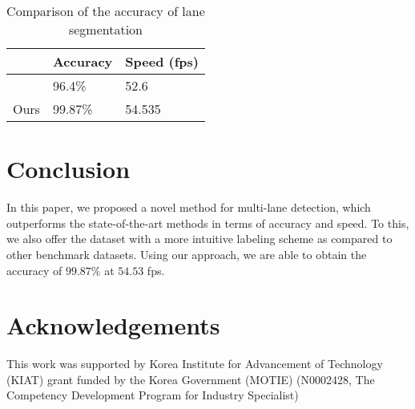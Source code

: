 \documentclass[fleqn,10pt,twocolumn]{ICCAS2019}
\begin{document}
\begin{table}[h!]
\setlength{\extrarowheight}{0.75ex}
\caption{Comparison of the accuracy of lane segmentation}
\label{comparision_accuracy}
\begin{center}
\begin{tabu}to\linewidth{|X[0.3c]|X[0.3c]|X[0.3c]|}\hline
& Accuracy & Speed (fps) \\ \hline
\cite{te2e} & 96.4\% & 52.6 \\\hline
Ours & 99.87\% & 54.535 \\\hline
\end{tabu}
\end{center}
\end{table}

\section{Conclusion}

In this paper, we proposed a novel method for multi-lane detection, which outperforms the state-of-the-art methods in terms of accuracy and speed. To this, we also offer the dataset with a more intuitive labeling scheme as compared to other benchmark datasets. Using our approach, we are able to obtain the accuracy of $99.87\%$ at $54.53$ fps.

\section*{Acknowledgements}

This work was supported by Korea Institute for Advancement of Technology (KIAT) grant funded by the Korea Government (MOTIE) (N0002428, The Competency Development Program for Industry Specialist)
\end{document}
